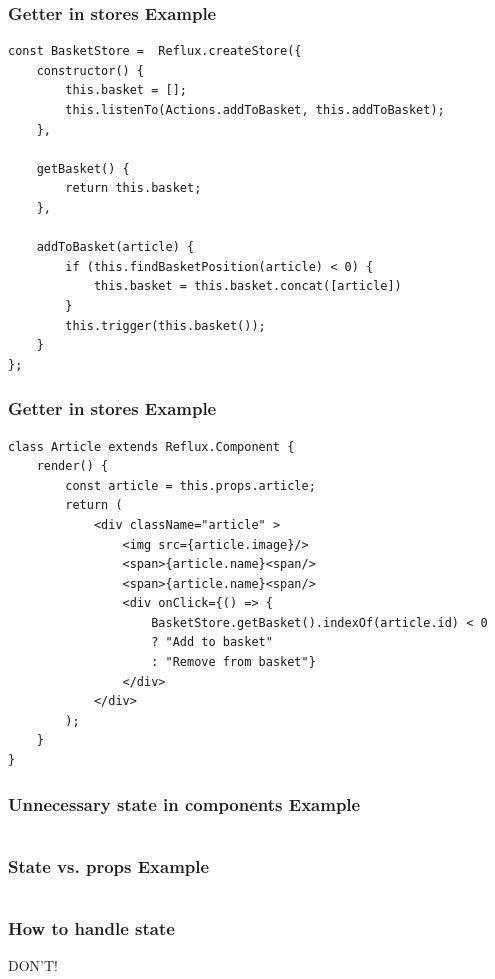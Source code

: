 \documentclass{beamer}
\begin{document}
\begin{frame}[fragile]\frametitle{Getter in stores \textendash{} Example}
\begin{lstlisting}[style=htmlcssjs]
const BasketStore =  Reflux.createStore({
    constructor() {
        this.basket = [];
        this.listenTo(Actions.addToBasket, this.addToBasket);
    },

    getBasket() {
        return this.basket;
    },

    addToBasket(article) {
        if (this.findBasketPosition(article) < 0) {
            this.basket = this.basket.concat([article])
        }
        this.trigger(this.basket());
    }
};
\end{lstlisting}
\end{frame}

\begin{frame}[fragile]\frametitle{Getter in stores \textendash{} Example}
\begin{lstlisting}[style=htmlcssjs]
class Article extends Reflux.Component {
    render() {
        const article = this.props.article;
        return (
            <div className="article" >
                <img src={article.image}/>
                <span>{article.name}<span/>
                <span>{article.name}<span/>
                <div onClick={() => {
                    BasketStore.getBasket().indexOf(article.id) < 0
                    ? "Add to basket"
                    : "Remove from basket"}
                </div>
            </div>
        );
    }
}
\end{lstlisting}
\end{frame}

\begin{frame}[fragile]\frametitle{Unnecessary state in components \textendash{} Example}
\begin{lstlisting}[style=htmlcssjs]

\end{lstlisting}
\end{frame}

\begin{frame}[fragile]\frametitle{State vs. props \textendash{} Example}
\begin{lstlisting}[style=htmlcssjs]

\end{lstlisting}
\end{frame}

\begin{frame}\frametitle{How to handle state}
\vspace*{\fill}
\begin{center}
\begin{minipage}{.6\textwidth}
DON'T!
\end{minipage}
\end{center}
\vfill %
\end{frame}
\end{document}
